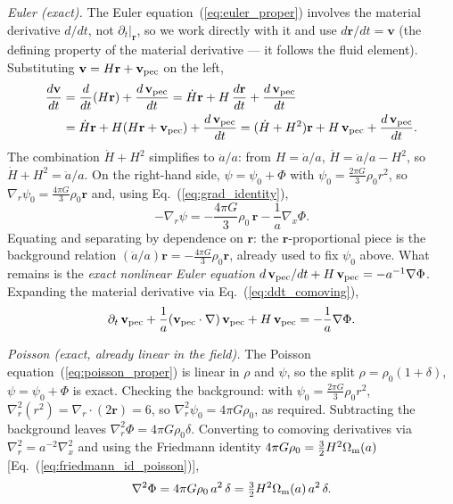 \documentclass[12pt]{article}
\newcommand{\br}{\mathbf{r}}
\newcommand{\bv}{\mathbf{v}}
\newcommand{\Omm}{\Omega_{\rm m}}
\begin{document}
\emph{Euler (exact).}  The Euler equation~(\ref{eq:euler_proper})
involves the material derivative $d/dt$, not $\partial_t|_\br$, so we
work directly with it and use $d\br/dt = \bv$ (the defining property
of the material derivative --- it follows the fluid element).
Substituting $\bv = H\br + \bv_{\rm pec}$ on the left,
%
\begin{align}
  \frac{d\bv}{dt}
  &= \frac{d}{dt}(H\br) + \frac{d\,\bv_{\rm pec}}{dt}
   = \dot H\br + H\,\frac{d\br}{dt} + \frac{d\,\bv_{\rm pec}}{dt}
  \notag\\
  &= \dot H\br + H(H\br + \bv_{\rm pec}) + \frac{d\,\bv_{\rm pec}}{dt}
   = (\dot H + H^2)\br + H\,\bv_{\rm pec} + \frac{d\,\bv_{\rm pec}}{dt}.
\end{align}
%
The combination $\dot H + H^2$ simplifies to $\ddot a/a$: from
$H = \dot a/a$, $\dot H = \ddot a/a - H^2$, so $\dot H + H^2 = \ddot
a/a$.  On the right-hand side, $\psi = \psi_0 + \Phi$ with
$\psi_0 = \tfrac{2\pi G}{3}\rho_0 r^2$, so
$\nabla_r\psi_0 = \tfrac{4\pi G}{3}\rho_0\br$ and, using
Eq.~(\ref{eq:grad_identity}),
%
\begin{equation}
  -\nabla_r\psi
  = -\frac{4\pi G}{3}\rho_0\,\br - \frac{1}{a}\nabla_x\Phi.
\end{equation}
%
Equating and separating by dependence on $\br$: the $\br$-proportional
piece is the background relation $(\ddot a/a)\br =
-\tfrac{4\pi G}{3}\rho_0\br$, already used to fix $\psi_0$ above.
What remains is the \emph{exact nonlinear Euler equation}
$d\,\bv_{\rm pec}/dt + H\,\bv_{\rm pec} = -a^{-1}\nabla\Phi$.  Expanding the
material derivative via Eq.~(\ref{eq:ddt_comoving}),
%
\begin{equation}
  \partial_t\,\bv_{\rm pec}
  + \frac{1}{a}(\bv_{\rm pec}\cdot\nabla)\,\bv_{\rm pec}
  + H\,\bv_{\rm pec}
  = -\frac{1}{a}\nabla\Phi.
  \label{eq:euler_nonlin}
\end{equation}

\emph{Poisson (exact, already linear in the field).}  The Poisson
equation~(\ref{eq:poisson_proper}) is linear in $\rho$ and $\psi$, so
the split $\rho = \rho_0(1+\delta)$, $\psi = \psi_0 + \Phi$ is exact.
Checking the background: with $\psi_0 = \tfrac{2\pi G}{3}\rho_0 r^2$,
$\nabla_r^2(r^2) = \nabla_r\cdot(2\br) = 6$, so
$\nabla_r^2\psi_0 = 4\pi G\rho_0$, as required.  Subtracting the
background leaves $\nabla_r^2\Phi = 4\pi G\rho_0\delta$.  Converting
to comoving derivatives via $\nabla_r^2 = a^{-2}\nabla_x^2$ and using
the Friedmann identity $4\pi G\rho_0 = \tfrac{3}{2}H^2\Omm(a)$
[Eq.~(\ref{eq:friedmann_id_poisson})],
%
\begin{equation}
  \nabla^2\Phi
  = 4\pi G\rho_0\,a^2\,\delta
  = \tfrac{3}{2}H^2\Omm(a)\,a^2\,\delta.
  \label{eq:poisson_nonlin}
\end{equation}
\end{document}
